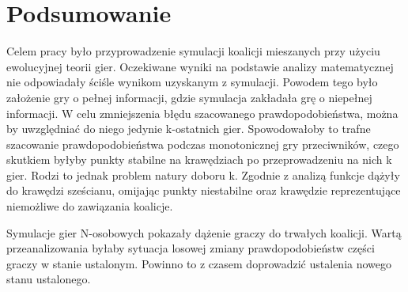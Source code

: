 \chapter{Podsumowanie}
\label{cha:podsumowanie}

Celem pracy było przyprowadzenie symulacji koalicji mieszanych przy użyciu ewolucyjnej teorii gier. Oczekiwane wyniki na podstawie analizy matematycznej nie odpowiadały ściśle wynikom uzyskanym z symulacji. Powodem tego było założenie gry o pełnej informacji, gdzie symulacja zakładała grę o niepełnej informacji. W celu zmniejszenia błędu szacowanego prawdopodobieństwa, można by uwzględniać do niego jedynie k-ostatnich gier. Spowodowałoby to trafne szacowanie prawdopodobieństwa podczas monotonicznej gry przeciwników, czego skutkiem byłyby punkty stabilne na krawędziach po przeprowadzeniu na nich k gier. Rodzi to jednak problem natury doboru k. Zgodnie z analizą funkcje dążyły do krawędzi sześcianu, omijając punkty niestabilne oraz krawędzie reprezentujące niemożliwe do zawiązania koalicje.

Symulacje gier N-osobowych pokazały dążenie graczy do trwałych koalicji. Wartą przeanalizowania byłaby sytuacja losowej zmiany prawdopodobieństw części graczy w stanie ustalonym. Powinno to z czasem doprowadzić ustalenia nowego stanu ustalonego. 
